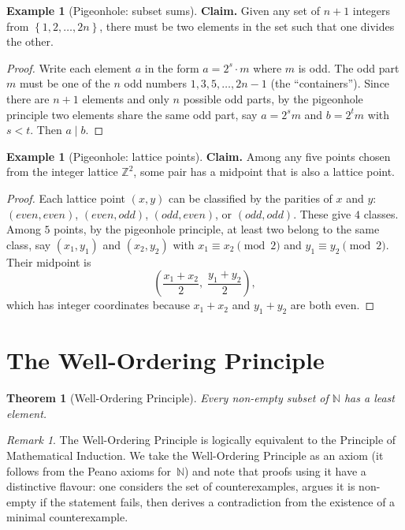 \documentclass[12pt,a4paper,openany]{book}
\theoremstyle{definition}
\newtheorem{example}[definition]{Example}
\theoremstyle{plain}
\newtheorem{theorem}[definition]{Theorem}
\theoremstyle{remark}
\newtheorem{remark}[definition]{Remark}
\newcommand{\N}{\mathbb{N}}
\newcommand{\Z}{\mathbb{Z}}
\newcommand{\set}[1]{\left\{#1\right\}}
\begin{document}
\begin{example}[Pigeonhole: subset sums]
\label{ex:pigeonhole-subsets}
\textbf{Claim.} Given any set of $n + 1$ integers from $\set{1, 2, \dots, 2n}$,
there must be two elements in the set such that one divides the other.

\begin{proof}
Write each element $a$ in the form $a = 2^{s} \cdot m$ where $m$ is odd. The odd
part $m$ must be one of the $n$ odd numbers $1, 3, 5, \dots, 2n - 1$ (the
``containers''). Since there are $n + 1$ elements and only $n$ possible odd parts,
by the pigeonhole principle two elements share the same odd part, say $a = 2^s m$
and $b = 2^t m$ with $s < t$. Then $a \mid b$.
\end{proof}
\end{example}

\begin{example}[Pigeonhole: lattice points]
\label{ex:pigeonhole-lattice}
\textbf{Claim.} Among any five points chosen from the integer lattice $\Z^2$,
some pair has a midpoint that is also a lattice point.

\begin{proof}
Each lattice point $(x, y)$ can be classified by the parities of $x$ and $y$:
$(even, even)$, $(even, odd)$, $(odd, even)$, or $(odd, odd)$. These give $4$
classes. Among $5$ points, by the pigeonhole principle, at least two belong to the
same class, say $(x_1, y_1)$ and $(x_2, y_2)$ with $x_1 \equiv x_2 \pmod{2}$ and
$y_1 \equiv y_2 \pmod{2}$. Their midpoint is
\[
  \left(\frac{x_1 + x_2}{2},\; \frac{y_1 + y_2}{2}\right),
\]
which has integer coordinates because $x_1 + x_2$ and $y_1 + y_2$ are both even.
\end{proof}
\end{example}

\section{The Well-Ordering Principle}
\label{sec:well-ordering}

\begin{theorem}[Well-Ordering Principle]
\label{thm:well-ordering}
Every non-empty subset of $\N$ has a least element.
\end{theorem}

\begin{remark}
\label{rem:well-ordering-equivalence}
The Well-Ordering Principle is logically equivalent to the Principle of Mathematical
Induction. We take the Well-Ordering Principle as an axiom (it follows from the Peano
axioms for~$\N$) and note that proofs using it have a distinctive flavour: one considers
the set of counterexamples, argues it is non-empty if the statement fails, then derives
a contradiction from the existence of a minimal counterexample.
\end{remark}
\end{document}
